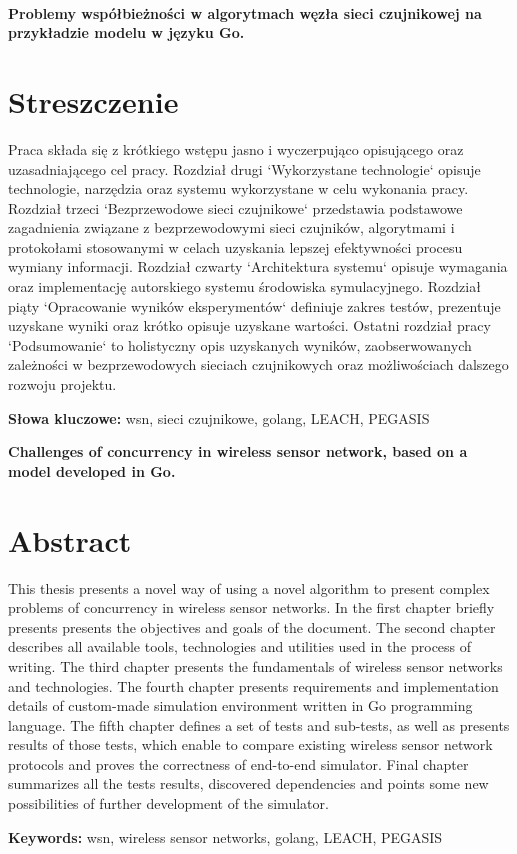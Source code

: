 \newpage~\newpage
\begin{center}
\large \bf
Problemy współbieżności w algorytmach węzła sieci czujnikowej na przykładzie modelu w języku Go.
\end{center}

\section*{Streszczenie}
Praca składa się z krótkiego wstępu jasno i wyczerpująco opisującego oraz uzasadniającego cel pracy.
Rozdział drugi `Wykorzystane technologie` opisuje technologie, narzędzia oraz systemu wykorzystane w celu wykonania pracy.
Rozdział trzeci `Bezprzewodowe sieci czujnikowe` przedstawia podstawowe zagadnienia związane z bezprzewodowymi sieci czujników, algorytmami i protokołami
stosowanymi w celach uzyskania lepszej efektywności procesu wymiany informacji.
Rozdział czwarty `Architektura systemu` opisuje wymagania oraz implementację autorskiego systemu środowiska symulacyjnego.
Rozdział piąty `Opracowanie wyników eksperymentów` definiuje zakres testów, prezentuje uzyskane wyniki oraz krótko opisuje uzyskane wartości.
Ostatni rozdział pracy `Podsumowanie` to holistyczny opis uzyskanych wyników, zaobserwowanych zależności w bezprzewodowych sieciach czujnikowych oraz możliwościach dalszego rozwoju projektu. 

\bigskip
{\noindent\bf Słowa kluczowe:} wsn, sieci czujnikowe, golang, LEACH, PEGASIS

\vskip 2cm

\newpage
\begin{center}
\large \bf
Challenges of concurrency in wireless sensor network, based on a model developed in Go.
\end{center}

\section*{Abstract}
This thesis presents a novel way of using a novel algorithm to present complex problems of concurrency in wireless sensor networks. 
In the first chapter briefly presents presents the objectives and goals of the document.
The second chapter describes all available tools, technologies and utilities used in the process of writing.
The third chapter presents the fundamentals of wireless sensor networks and technologies.
The fourth chapter presents requirements and implementation details of custom-made simulation environment written in Go programming language.
The fifth chapter defines a set of tests and sub-tests, as well as presents results of those tests, which enable to compare existing wireless sensor network protocols
and proves the correctness of end-to-end simulator.
Final chapter summarizes all the tests results, discovered dependencies and points some new possibilities of further development of the simulator.

\bigskip
{\noindent\bf Keywords:} wsn, wireless sensor networks, golang, LEACH, PEGASIS

\vfill